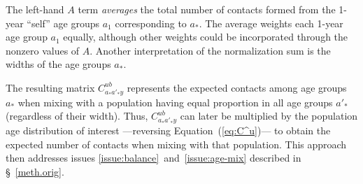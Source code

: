 The left-hand $A$ term \textit{averages} the total number of contacts
formed from the 1-year ``self'' age groups $a_1$ corresponding to $a_*$.
The average weights each 1-year age group $a_1$ equally,
although other weights could be incorporated through the nonzero values of $A$.
Another interpretation of the normalization sum is the widths of the age groups $a_*$.
\par
The resulting matrix $C^{ub}_{a_*a'_*y}$ represents the expected contacts among age groups $a_*$
when mixing with a population having equal proportion in all age groups $a'_*$ (regardless of their width).
Thus, $C^{ub}_{a_*a'_*y}$ can later be multiplied by the population age distribution of interest%
---reversing Equation~(\ref{eq:C^u})---%
to obtain the expected number of contacts when mixing with that population.
This approach then addresses issues \ref{issue:balance}~and~\ref{issue:age-mix}
described in \S~\ref{meth.orig}.
